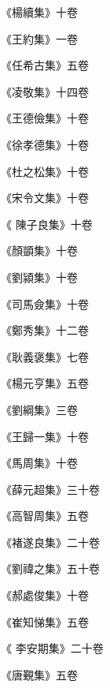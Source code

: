 \begin{pinyinscope}
 《楊續集》十卷



 《王約集》一卷



 《任希古集》五卷



 《凌敬集》十四卷



 《王德儉集》十卷



 《徐孝德集》十卷



 《杜之松集》十卷



 《宋令文集》十卷



 《
 陳子良集》十卷



 《顏顗集》十卷



 《劉潁集》十卷



 《司馬僉集》十卷



 《鄭秀集》十二卷



 《耿義褒集》七卷



 《楊元亨集》五卷



 《劉綱集》三卷



 《王歸一集》十卷



 《馬周集》十卷



 《薛元超集》三十卷



 《高智周集》五卷



 《褚遂良集》二十卷



 《劉禕之集》五十卷



 《郝處俊集》十卷



 《崔知悌集》五卷



 《
 李安期集》二十卷



 《唐覲集》五卷




\end{pinyinscope}
